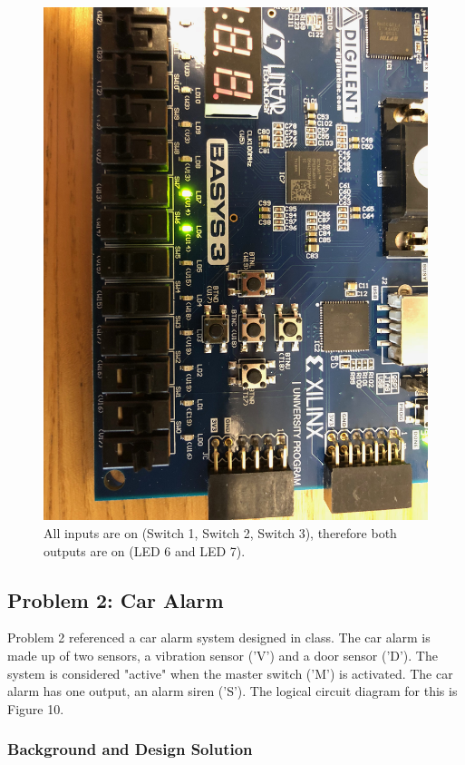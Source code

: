 \documentclass[11pt]{article}
\begin{document}
\begin{figure}[H]
	\includegraphics[width=\textwidth]{report_images/Lab1BoardPictures/Lab1Part1/IMG_0410.jpg}
	\caption{\label{fig:figure-name}All inputs are on (Switch 1, Switch 2, Switch 3), therefore both outputs are on (LED 6 and LED 7).}
\end{figure}

\subsection{Problem 2: Car Alarm}

Problem 2 referenced a car alarm system designed in class. The car alarm is made up of two sensors, a vibration sensor ('V') and a door sensor ('D'). The system is considered "active" when the master switch ('M') is activated. The car alarm has one output, an alarm siren ('S'). The logical circuit diagram for this is Figure 10.

\subsubsection{Background and Design Solution}
\end{document}
